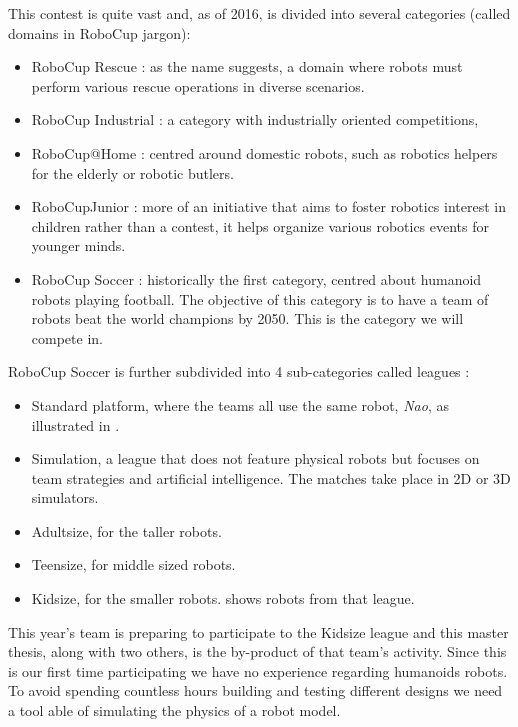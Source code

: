 This contest is quite vast and, as of 2016, is divided into several categories (called domains in RoboCup jargon):
\begin{itemize}
\item RoboCup Rescue : as the name suggests, a domain where robots must perform various rescue operations in diverse scenarios.
\item RoboCup Industrial : a category with industrially oriented competitions, 
\item RoboCup@Home : centred around domestic robots, such as robotics helpers for the elderly or robotic butlers.
\item RoboCupJunior : more of an initiative that aims to foster robotics interest in children rather than a contest, it helps organize various robotics events for younger minds.
\item RoboCup Soccer : historically the first category, centred about humanoid robots playing football. The objective of this category is to have a team of robots beat the world champions by 2050. This is the category we will compete in.
\end{itemize}

RoboCup Soccer is further subdivided into 4 sub-categories called leagues :\begin{itemize}
\item Standard platform, where the teams all use the same robot, \emph{Nao}, as illustrated in .
\item Simulation, a league that does not feature physical robots but focuses on team strategies and artificial intelligence. The matches take place in 2D or 3D simulators.
\item Adultsize, for the taller robots.
\item Teensize, for middle sized robots.
\item Kidsize, for the smaller robots.  shows robots from that league.
\end{itemize}

This year's team is preparing to participate to the Kidsize league and this master thesis, along with two others, is the by-product of that team's activity. Since this is our first time participating we have no experience regarding humanoids robots. To avoid spending countless hours building and testing different designs we need a tool able of simulating the physics of a robot model. 

